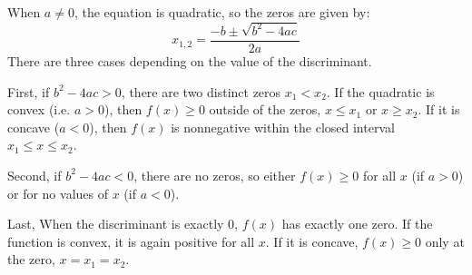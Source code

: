 \documentclass{homework}
\begin{document}
\begin{enumerate}
When $a \neq 0$, the equation is quadratic, so the zeros are given by:
\begin{equation*}
    x_{1,2} = \frac{-b \pm \sqrt{b^2 - 4ac}}{2a}
\end{equation*}
There are three cases depending on the value of the discriminant.

First, if $b^2 - 4ac > 0$, there are two distinct zeros $x_1 < x_2$. If the
quadratic is convex (i.e. $a>0$), then $f(x)\geq0$ outside of the zeros,
$x \leq x_1$ or $x \geq x_2$. If it is concave ($a<0$), then $f(x)$ is nonnegative
within the closed interval $x_1 \leq x \leq x_2$. 

Second, if $b^2 - 4ac < 0$, there are no zeros, so either $f(x) \geq 0$ for all $x$
(if $a > 0$) or for no values of $x$ (if $a < 0$).

Last, When the discriminant is exactly 0, $f(x)$ has exactly one zero. If the
function is convex, it is again positive for all $x$. If it is concave, $f(x) \geq 0$
only at the zero, $x = x_1 = x_2$.

\end{enumerate}
\end{document}
